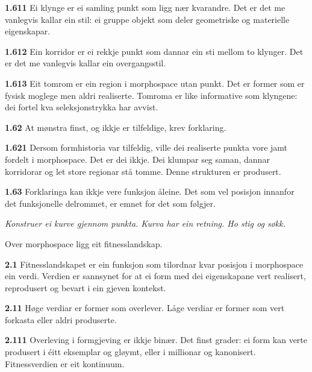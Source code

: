 \documentclass[11pt, a4paper]{article}
\newcommand{\prop}[1]{\bigskip\noindent{\Large\textbf{\textcolor{propcolor}{#1}}}\quad}
\newcommand{\subprop}[1]{\medskip\noindent\textbf{#1}\quad}
\begin{document}
\subprop{1.611} Ei klynge er ei samling punkt som ligg n\ae r kvarandre. Det er det me vanlegvis kallar ein stil: ei gruppe objekt som deler geometriske og materielle eigenskapar.

\subprop{1.612} Ein korridor er ei rekkje punkt som dannar ein sti mellom to klynger. Det er det me vanlegvis kallar ein overgangsstil.

\subprop{1.613} Eit tomrom er ein region i morphospace utan punkt. Det er former som er fysisk moglege men aldri realiserte. Tomroma er like informative som klyngene: dei fortel kva seleksjonstrykka har avvist.

\subprop{1.62} At m\o nstra finst, og ikkje er tilfeldige, krev forklaring.

\subprop{1.621} Dersom formhistoria var tilfeldig, ville dei realiserte punkta vore jamt fordelt i morphospace. Det er dei ikkje. Dei klumpar seg saman, dannar korridorar og let store regionar st\aa{} tomme. Denne strukturen er produsert.

\subprop{1.63} Forklaringa kan ikkje vere funksjon \aa leine. Det som vel posisjon innanfor det funksjonelle delrommet, er emnet for det som f\o lgjer.



\vspace{1.5em}
\begin{center}
\emph{Konstruer ei kurve gjennom punkta. Kurva har ein retning. Ho stig og s\o kk.}
\end{center}
\vspace{1.5em}



\prop{2} Over morphospace ligg eit fitnesslandskap.

\subprop{2.1} Fitnesslandskapet er ein funksjon som tilordnar kvar posisjon i morphospace ein verdi. Verdien er sannsynet for at ei form med dei eigenskapane vert realisert, reprodusert og bevart i ein gjeven kontekst.

\subprop{2.11} H\o ge verdiar er former som overlever. L\aa ge verdiar er former som vert forkasta eller aldri produserte.

\subprop{2.111} Overleving i formgjeving er ikkje bin\ae r. Det finst grader: ei form kan verte produsert i \'eitt eksemplar og gl\o ymt, eller i millionar og kanonisert. Fitnessverdien er eit kontinuum.
\end{document}
